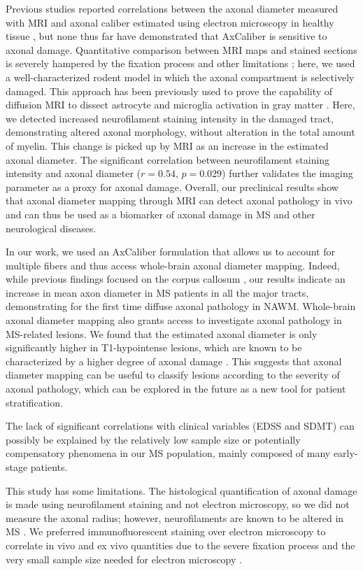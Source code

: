 \documentclass[11pt]{article}
\begin{document}
Previous studies reported correlations between the axonal diameter measured with MRI and axonal caliber estimated using electron microscopy in healthy tissue \cite{Barazany2009}, but none thus far have demonstrated that AxCaliber is sensitive to axonal damage. Quantitative comparison between MRI maps and stained sections is severely hampered by the fixation process and other limitations \cite{Horowitz2015b}; here, we used a well-characterized rodent model in which the axonal compartment is selectively damaged. This approach has been previously used to prove the capability of diffusion MRI to dissect astrocyte and microglia activation in gray matter \cite{GarciaHernandez2020}. Here, we detected increased neurofilament staining intensity in the damaged tract, demonstrating altered axonal morphology, without alteration in the total amount of myelin. This change is picked up by MRI as an increase in the estimated axonal diameter. The significant correlation between neurofilament staining intensity and axonal diameter ($r=0.54$, $p=0.029$) further validates the imaging parameter as a proxy for axonal damage. Overall, our preclinical results show that axonal diameter mapping through MRI can detect axonal pathology in vivo and can thus be used as a biomarker of axonal damage in MS and other neurological diseases.

In our work, we used an AxCaliber formulation that allows us to account for multiple fibers and thus access whole-brain axonal diameter mapping. Indeed, while previous findings focused on the corpus callosum \cite{Huang2016}, our results indicate an increase in mean axon diameter in MS patients in all the major tracts, demonstrating for the first time diffuse axonal pathology in NAWM. Whole-brain axonal diameter mapping also grants access to investigate axonal pathology in MS-related lesions. We found that the estimated axonal diameter is only significantly higher in T1-hypointense lesions, which are known to be characterized by a higher degree of axonal damage \cite{VanWaesberghe1999}. This suggests that axonal diameter mapping can be useful to classify lesions according to the severity of axonal pathology, which can be explored in the future as a new tool for patient stratification.

The lack of significant correlations with clinical variables (EDSS and SDMT) can possibly be explained by the relatively low sample size or potentially compensatory phenomena in our MS population, mainly composed of many early-stage patients.

This study has some limitations. The histological quantification of axonal damage is made using neurofilament staining and not electron microscopy, so we did not measure the axonal radius; however, neurofilaments are known to be altered in MS \cite{Petzold2005}. We preferred immunofluorescent staining over electron microscopy to correlate in vivo and ex vivo quantities due to the severe fixation process and the very small sample size needed for electron microscopy \cite{Horowitz2015b}.
\end{document}
